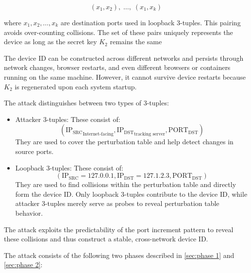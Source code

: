 \documentclass{report}
\begin{document}
\[
	(x_1, x_2),\; \ldots,\; (x_1, x_k)
\]

where $x_1, x_2, \ldots, x_k$ are destination ports used in loopback 3-tuples. This pairing avoids over-counting collisions. The set of these pairs uniquely represents the device as long as the secret key $K_2$ remains the same

The device ID can be constructed across different networks and persists through network changes, browser restarts, and even different browsers or containers running on the same machine. However, it cannot survive device restarts because $K_2$ is regenerated upon each system startup.

The attack distinguishes between two types of 3-tuples:

\begin{itemize}
	\item \alert{Attacker 3-tuples:} These consist of:
	\begin{equation*}
		(\mathrm{IP_{SRC}}_{\text{Internet-facing}}, \mathrm{IP_{DST}}_{\text{tracking server}}, \mathrm{PORT_{DST}})
	\end{equation*}
	They are used to cover the perturbation table and help detect changes in source ports.

	\item \alert{Loopback 3-tuples:} These consist of:
	\begin{equation*}
		(\mathrm{IP_{SRC}} = 127.0.0.1, \mathrm{IP_{DST}} = 127.1.2.3, \mathrm{PORT_{DST}})
	\end{equation*}
	They are used to find collisions within the perturbation table and directly form the device ID. Only loopback 3-tuples contribute to the device ID, while attacker 3-tuples merely serve as probes to reveal perturbation table behavior.
\end{itemize}

The attack exploits the predictability of the port increment pattern to reveal these collisions and thus construct a stable, cross-network device ID.

The attack consists of the following two phases described in \ref{sec:phase 1} and \ref{sec:phase 2}:

%
\end{document}
